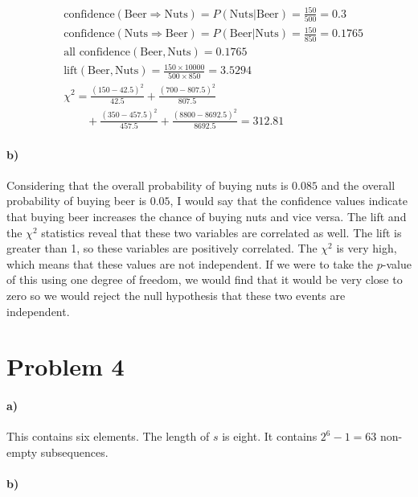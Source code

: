 \documentclass[12pt]{article}
\begin{document}
\begin{align*}
    &\text{confidence}(\text{Beer}\Rightarrow\text{Nuts})=P(\text{Nuts}|\text{Beer})=\frac{150}{500}=0.3\\
    &\text{confidence}(\text{Nuts}\Rightarrow\text{Beer})=P(\text{Beer}|\text{Nuts})=\frac{150}{850}=0.1765\\
    &\text{all confidence}(\text{Beer},\text{Nuts})=0.1765\\
    &\text{lift}(\text{Beer},\text{Nuts})=\frac{150\times10000}{500\times850}=3.5294\\
    &\chi^2=\frac{(150-42.5)^2}{42.5}+\frac{(700-807.5)^2}{807.5}\\
    &\qquad+\frac{(350-457.5)^2}{457.5}+\frac{(8800-8692.5)^2}{8692.5}=312.81
\end{align*}

\paragraph{b)}

Considering that the overall probability of buying nuts is \(0.085\) and the overall probability of buying beer
is \(0.05\), I would say that the confidence values indicate that buying beer increases the chance of buying nuts and vice
versa. The lift and the \(\chi^2\) statistics reveal that these two variables are correlated as well. The lift is
greater than 1, so these variables are positively correlated. The \(\chi^2\) is very high, which means that these values
are not independent. If we were to take the \(p\)-value of this using one degree of freedom, we would find that it
would be very close to zero so we would reject the null hypothesis that these two events are independent.

\section*{Problem 4}

\paragraph{a)}

This contains six elements. The length of \(s\) is eight. It contains \(2^6-1=63\) non-empty subsequences.

\paragraph{b)}
\end{document}
